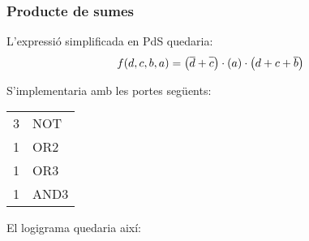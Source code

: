 \subsubsection{Producte de sumes}

L'expressió simplificada en PdS quedaria:
%
\begin{equation*}
  f(d,c,b,a) = \left( \D + \C \right) \cdot \left( a \right) \cdot \left( d + c + \B \right)
\end{equation*}

S'implementaria amb les portes següents:

\begin{center} \begin{tabular}{rl}
3 & \textsf{NOT} \\
1 & \textsf{OR2} \\
1 & \textsf{OR3} \\
1 & \textsf{AND3} \\
\end{tabular} \end{center}

El logigrama quedaria així:

